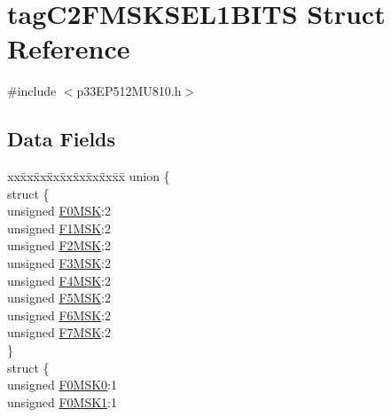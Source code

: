 \hypertarget{structtag_c2_f_m_s_k_s_e_l1_b_i_t_s}{}\section{tag\+C2\+F\+M\+S\+K\+S\+E\+L1\+B\+I\+TS Struct Reference}
\label{structtag_c2_f_m_s_k_s_e_l1_b_i_t_s}


{\ttfamily \#include $<$p33\+E\+P512\+M\+U810.\+h$>$}

\subsection*{Data Fields}
\begin{DoxyCompactItemize}
\item 
\begin{tabbing}
xx\=xx\=xx\=xx\=xx\=xx\=xx\=xx\=xx\=\kill
union \{\\
\>struct \{\\
\>\>unsigned \hyperlink{structtag_c2_f_m_s_k_s_e_l1_b_i_t_s_ab644e66a0cb1fa8ebe0eb8edf2fdeb65}{F0MSK}:2\\
\>\>unsigned \hyperlink{structtag_c2_f_m_s_k_s_e_l1_b_i_t_s_a80d211c92d09eff43c188fa37806521f}{F1MSK}:2\\
\>\>unsigned \hyperlink{structtag_c2_f_m_s_k_s_e_l1_b_i_t_s_a5089e591bc66271758ae06d5b1e16d4b}{F2MSK}:2\\
\>\>unsigned \hyperlink{structtag_c2_f_m_s_k_s_e_l1_b_i_t_s_a7b7ece0bd35899c92a42b741f3ae84b6}{F3MSK}:2\\
\>\>unsigned \hyperlink{structtag_c2_f_m_s_k_s_e_l1_b_i_t_s_a65ead43e093ca7f024c50adb447538e3}{F4MSK}:2\\
\>\>unsigned \hyperlink{structtag_c2_f_m_s_k_s_e_l1_b_i_t_s_afc1994ee77be029f668973159b50255a}{F5MSK}:2\\
\>\>unsigned \hyperlink{structtag_c2_f_m_s_k_s_e_l1_b_i_t_s_ac04675bc836b795f0d136ca8324d4df3}{F6MSK}:2\\
\>\>unsigned \hyperlink{structtag_c2_f_m_s_k_s_e_l1_b_i_t_s_a50fce8d5fa31f23a5c22db25853b6c4d}{F7MSK}:2\\
\>\} \\
\>struct \{\\
\>\>unsigned \hyperlink{structtag_c2_f_m_s_k_s_e_l1_b_i_t_s_a03a07b75f432dd5ad6d56cabbd781ffa}{F0MSK0}:1\\
\>\>unsigned \hyperlink{structtag_c2_f_m_s_k_s_e_l1_b_i_t_s_a493a191d3740c047cb36fb697198c08d}{F0MSK1}:1\\

\end{tabbing}
\end{DoxyCompactItemize}
